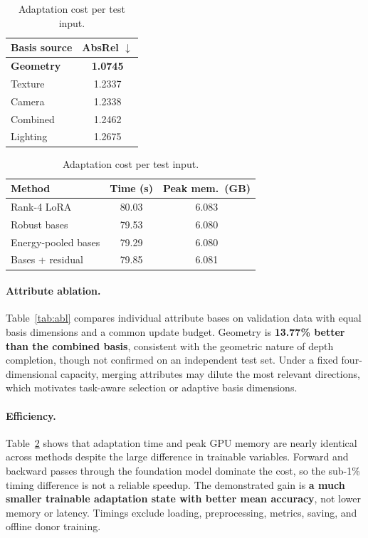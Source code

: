 \documentclass{article}
\begin{document}
\begin{table}[h]
  \centering
  \small
  \begin{minipage}[t]{0.40\linewidth}
    \centering
    \caption{Attribute ablation on validation (unobs.\ AbsRel \%).}
    \label{tab:abl}
    \begin{tabular}{lc}
      \toprule
      Basis source & AbsRel $\downarrow$ \\
      \midrule
      \textbf{Geometry} & \textbf{1.0745} \\
      Texture & 1.2337 \\
      Camera & 1.2338 \\
      Combined & 1.2462 \\
      Lighting & 1.2675 \\
      \bottomrule
    \end{tabular}
  \end{minipage}\hfill
  \begin{minipage}[t]{0.56\linewidth}
    \centering
    \caption{Adaptation cost per test input.}
    \label{tab:eff}
    \begin{tabular}{lcc}
      \toprule
      Method & Time (s) & Peak mem.\ (GB) \\
      \midrule
      Rank-4 LoRA & 80.03 & 6.083 \\
      Robust bases & 79.53 & 6.080 \\
      Energy-pooled bases & 79.29 & 6.080 \\
      Bases + residual & 79.85 & 6.081 \\
      \bottomrule
    \end{tabular}
  \end{minipage}
\end{table}

\paragraph{Attribute ablation.} Table~\ref{tab:abl} compares individual attribute bases on validation data with equal basis dimensions and a common update budget. Geometry is \textbf{13.77\% better than the combined basis}, consistent with the geometric nature of depth completion, though not confirmed on an independent test set. Under a fixed four-dimensional capacity, merging attributes may dilute the most relevant directions, which motivates task-aware selection or adaptive basis dimensions.

\paragraph{Efficiency.} Table~\ref{tab:eff} shows that adaptation time and peak GPU memory are nearly identical across methods despite the large difference in trainable variables. Forward and backward passes through the foundation model dominate the cost, so the sub-1\% timing difference is not a reliable speedup. The demonstrated gain is \textbf{a much smaller trainable adaptation state with better mean accuracy}, not lower memory or latency. Timings exclude loading, preprocessing, metrics, saving, and offline donor training.
\end{document}
